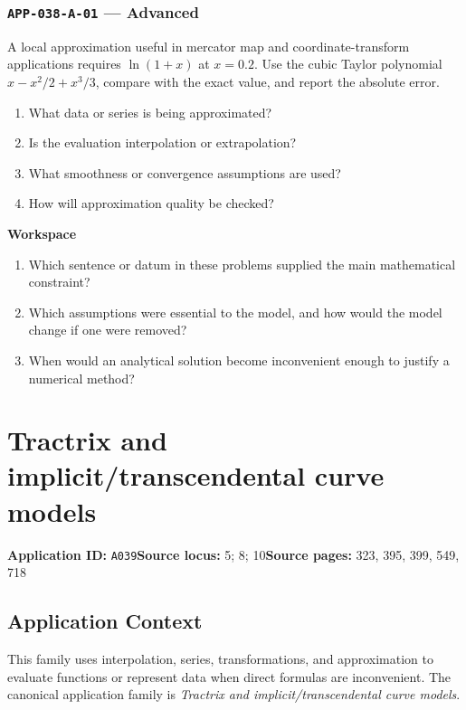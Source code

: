 \documentclass[11pt]{book}
\newcommand{\pid}[1]{\texttt{#1}}
\newcommand{\workspace}{\par\vspace{0.7in}\hrulefill\par\vspace{0.55in}\hrulefill\par}
\begin{document}
\subsection*{\pid{APP-038-A-01} — Advanced}
\begin{problembox}
A local approximation useful in mercator map and coordinate-transform applications requires $\ln(1+x)$ at $x=0.2$. Use the cubic Taylor polynomial $x-x^2/2+x^3/3$, compare with the exact value, and report the absolute error.
\end{problembox}
\begin{promptbox}\begin{enumerate}
\item What data or series is being approximated?
\item Is the evaluation interpolation or extrapolation?
\item What smoothness or convergence assumptions are used?
\item How will approximation quality be checked?
\end{enumerate}\end{promptbox}
\textbf{Workspace}\workspace
\begin{reflectionbox}\begin{enumerate}
\item Which sentence or datum in these problems supplied the main mathematical constraint?
\item Which assumptions were essential to the model, and how would the model change if one were removed?
\item When would an analytical solution become inconvenient enough to justify a numerical method?
\end{enumerate}\end{reflectionbox}
\chapter{Tractrix and implicit/transcendental curve models}\label{app:A039}
\textbf{Application ID:} \pid{A039}\quad \textbf{Source locus:} 5; 8; 10\quad \textbf{Source pages:} 323, 395, 399, 549, 718
\section*{Application Context}
This family uses interpolation, series, transformations, and approximation to evaluate functions or represent data when direct formulas are inconvenient. The canonical application family is \emph{Tractrix and implicit/transcendental curve models}.
\end{document}
